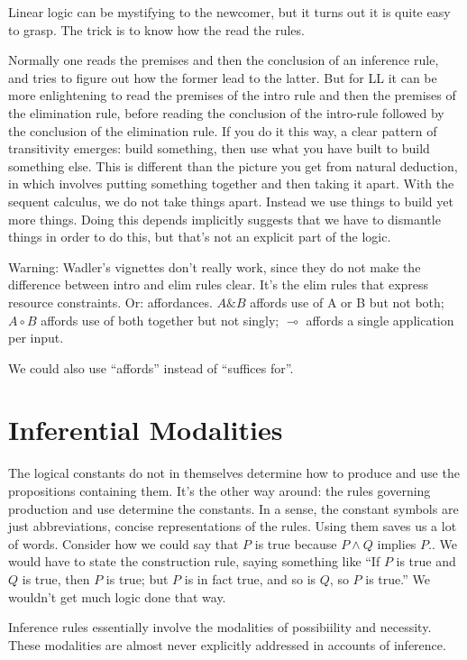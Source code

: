 \documentclass{article}
\begin{document}
Linear logic can be mystifying to the newcomer, but it turns out it is
quite easy to grasp. The trick is to know how the read the rules.

Normally one reads the premises and then the conclusion of an
inference rule, and tries to figure out how the former lead to the
latter. But for LL it can be more enlightening to read the premises of
the intro rule and then the premises of the elimination rule, before
reading the conclusion of the intro-rule followed by the conclusion of
the elimination rule. If you do it this way, a clear pattern of
transitivity emerges: build something, then use what you have built to
build something else. This is different than the picture you get from
natural deduction, in which involves putting something together and
then taking it apart. With the sequent calculus, we do not take things
apart. Instead we use things to build yet more things. Doing this
depends implicitly suggests that we have to dismantle things in order
to do this, but that's not an explicit part of the logic.

Warning: Wadler's vignettes don't really work, since they do not make
the difference between intro and elim rules clear. It's the elim rules
that express resource constraints. Or: affordances. \(A\&B\) affords
use of A or B but not both; \(A\circ B\) affords use of both together
but not singly; \(\multimap\) affords a single application per input.

We could also use ``affords'' instead of ``suffices for''.


\section{Inferential Modalities}

The logical constants do not in themselves determine how to produce
and use the propositions containing them. It's the other way around:
the rules governing production and use determine the constants. In a
sense, the constant symbols are just abbreviations, concise
representations of the rules. Using them saves us a lot of words.
Consider how we could say that \(P\) is true because \(P\land Q\)
implies \(P\).. We would have to state the construction rule, saying
something like ``If \(P\) is true and \(Q\) is true, then \(P\) is
true; but \(P\) is in fact true, and so is \(Q\), so \(P\) is true.''
We wouldn't get much logic done that way.

Inference rules essentially involve the modalities of possibiility and
necessity. These modalities are almost never explicitly addressed in
accounts of inference.
\end{document}
